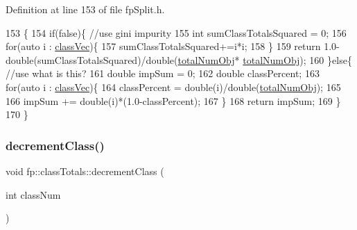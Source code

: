 Definition at line 153 of file fp\+Split.\+h.


\begin{DoxyCode}
153                                                  \{
154                 \textcolor{keywordflow}{if}(\textcolor{keyword}{false})\{ \textcolor{comment}{//use gini impurity}
155                     \textcolor{keywordtype}{int} sumClassTotalsSquared = 0;
156                     \textcolor{keywordflow}{for}(\textcolor{keyword}{auto} i : \hyperlink{classfp_1_1classTotals_af96102537592dbda8601d0235dfccfca}{classVec})\{
157                         sumClassTotalsSquared+=i*i;
158                     \}
159                     \textcolor{keywordflow}{return} 1.0-double(sumClassTotalsSquared)/double(\hyperlink{classfp_1_1classTotals_a97be63e3e4a1b7c553df839034828aae}{totalNumObj}*
      \hyperlink{classfp_1_1classTotals_a97be63e3e4a1b7c553df839034828aae}{totalNumObj});
160                 \}\textcolor{keywordflow}{else}\{ \textcolor{comment}{//use what is this?}
161                     \textcolor{keywordtype}{double} impSum = 0;
162                     \textcolor{keywordtype}{double} classPercent;
163                     \textcolor{keywordflow}{for}(\textcolor{keyword}{auto} i : \hyperlink{classfp_1_1classTotals_af96102537592dbda8601d0235dfccfca}{classVec})\{
164                         classPercent = double(i)/double(\hyperlink{classfp_1_1classTotals_a97be63e3e4a1b7c553df839034828aae}{totalNumObj});
165 
166                         impSum += double(i)*(1.0-classPercent);
167                     \}
168                     \textcolor{keywordflow}{return} impSum;
169                 \}
170             \}
\end{DoxyCode}
\mbox{\label{classfp_1_1classTotals_af388dc1e664488603f7834da2f097a06}} 
\subsubsection{\texorpdfstring{decrement\+Class()}{decrementClass()}}
{\footnotesize\ttfamily void fp\+::class\+Totals\+::decrement\+Class (\begin{DoxyParamCaption}\item[{int}]{class\+Num }\end{DoxyParamCaption})\hspace{0.3cm}{\ttfamily [inline]}}



